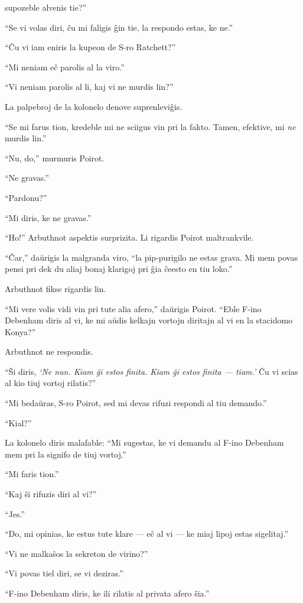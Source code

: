 supozeble alvenis tie?''

``Se vi volas diri, ĉu mi faligis ĝin tie, la respondo estas, ke ne.''

``Ĉu vi iam eniris la kupeon de S-ro Ratchett?''

``Mi neniam eĉ parolis al la viro.''

``Vi neniam parolis al li, kaj vi ne murdis lin?''

La palpebroj de la kolonelo denove suprenleviĝis.

``Se mi farus tion, kredeble mi ne sciigus vin pri la fakto. Tamen, efektive, mi \emph{ne} murdis lin.''

``Nu, do,'' murmuris Poirot.

``Ne gravas.''

``Pardonu?''

``Mi diris, ke ne gravas.''

``Ho!'' Arbuthnot aspektis surprizita. Li rigardis Poirot maltrankvile.

``Ĉar,'' daŭrigis la malgranda viro, ``la pip-purigilo ne estas grava. Mi mem povas pensi pri dek du aliaj bonaj klarigoj pri ĝia ĉeesto en tiu loko.''

Arbuthnot fikse rigardis lin.

``Mi vere volis vidi vin pri tute alia afero,'' daŭrigis Poirot. ``Eble F-ino Debenham diris al vi, ke mi aŭdis kelkajn vortojn diritajn al vi en la stacidomo Konya?''

Arbuthnot ne respondis.

``Ŝi diris, \emph{`Ne nun. Kiam ĝi estos finita. Kiam ĝi estos finita --- tiam.'} Ĉu vi scias al kio tiuj vortoj rilatis?''

``Mi bedaŭras, S-ro Poirot, sed mi devas rifuzi respondi al tiu demando.''

``Kial?''

La kolonelo diris malafable: ``Mi sugestas, ke vi demandu al F-ino Debenham mem pri la signifo de tiuj vortoj.''

``Mi faris tion.''

``Kaj ŝi rifuzis diri al vi?''

``Jes.''

``Do, mi opinias, ke estus tute klare --- eĉ al vi --- ke miaj lipoj estas sigelitaj.''

``Vi ne malkaŝos la sekreton de virino?''

``Vi povas tiel diri, se vi deziras.''

``F-ino Debenham diris, ke ili rilatis al privata afero ŝia.''

